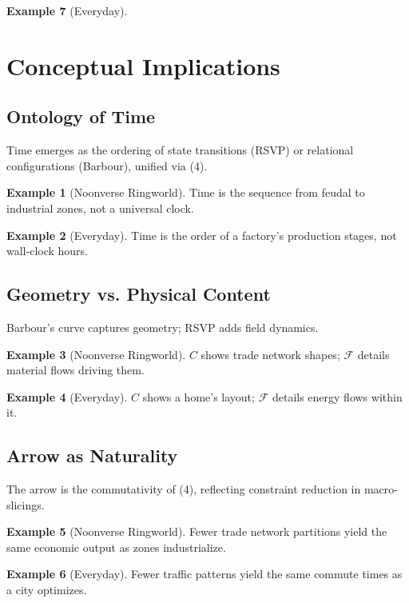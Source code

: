 \documentclass[11pt]{article}
\theoremstyle{plain}
\theoremstyle{definition}
\newtheorem{example}{Example}[section]
\begin{document}
\begin{example}[Everyday]
\section{Conceptual Implications}

\subsection{Ontology of Time}
Time emerges as the ordering of state transitions (RSVP) or relational configurations (Barbour), unified via (4).

\begin{example}[Noonverse Ringworld]
Time is the sequence from feudal to industrial zones, not a universal clock.
\end{example}

\begin{example}[Everyday]
Time is the order of a factory’s production stages, not wall-clock hours.
\end{example}

\subsection{Geometry vs. Physical Content}
Barbour’s curve captures geometry; RSVP adds field dynamics.

\begin{example}[Noonverse Ringworld]
$C$ shows trade network shapes; $\mathscr{F}$ details material flows driving them.
\end{example}

\begin{example}[Everyday]
$C$ shows a home’s layout; $\mathscr{F}$ details energy flows within it.
\end{example}

\subsection{Arrow as Naturality}
The arrow is the commutativity of (4), reflecting constraint reduction in macro-slicings.

\begin{example}[Noonverse Ringworld]
Fewer trade network partitions yield the same economic output as zones industrialize.
\end{example}

\begin{example}[Everyday]
Fewer traffic patterns yield the same commute times as a city optimizes.
\end{example}


\end{example}
\end{document}
